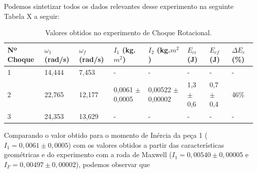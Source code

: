 Podemos sintetizar todos os dados relevantes desse experimento na seguinte Tabela X a seguir: 

\begin{table}[H]
    \centering
    \begin{tabular}{ |M{1.6cm}||M{1.5cm}||M{1.5cm}||M{1.6cm}||M{1.9cm}||M{1.3cm}||M{1.3cm}||M{1cm}|}
        \hline
        \textbf{Nº Choque} & \textbf{$\omega_1$ (rad/s)} & \textbf{$\omega_f$ (rad/s)} & \textbf{$I_1$ (kg.$m^2$)} & \textbf{$I_2$ (kg.$m^2$)} & \textbf{$E_{ci}$ (J)} & \textbf{$E_{cf}$ (J)} & \textbf{$\Delta E_c$ (\%)}\\
         & 14,444 & 7,453 & - & - & - & - & -\\
        2 & 22,765 & 12,177 & 0,0061 $\pm$ 0,0005 & 0,00522 $\pm$ 0,00002 & 1,3 $\pm$ 0,6 & 0,7 $\pm$ 0,4 & 46\%\\
        3 & 24,353 & 13,629 & - & - & - & - & -\\
        \hline
    \end{tabular}
    \caption{Valores obtidos no experimento de Choque Rotacional.}
\end{table}

Comparando o valor obtido para o momento de Inércia da peça 1 ($I_1 = 0,0061 \pm 0,0005$) com os valores obtidos a partir das características geométricas e do experimento com a roda de Maxwell ($I_1 = 0,00540 \pm 0,00005$ e $I_F = 0,00497 \pm 0,00002$), podemos observar que 
